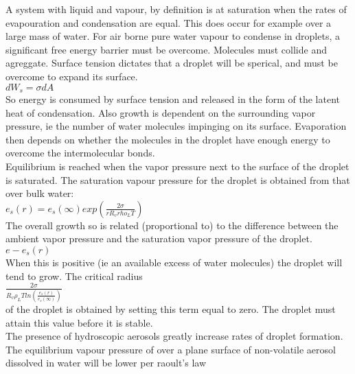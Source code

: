 \documentclass[11pt]{article} %
\begin{document}
A system with liquid and vapour, by definition is at saturation when the rates of evapouration and condensation are equal.  This does occur for example over a large mass of water.  For air borne pure water vapour to condense in droplets, a significant free energy barrier must be overcome.  Molecules must collide and agreggate.  Surface tension dictates that a droplet will be sperical, and must be overcome to expand its surface. \\

$dW_{s} = \sigma dA $ \\

So energy is consumed by surface tension and released in the form of the latent heat of condensation.  Also growth is dependent on the surrounding vapor pressure, ie the number of water molecules impinging on its surface.  Evaporation then depends on whether the molecules in the droplet have enough energy to overcome the intermolecular bonds.  \\

Equilibrium is reached when the vapor pressure next to the surface of the droplet is saturated. The saturation vapour pressure for the droplet is obtained from that over bulk water:\\

 $e_{s}(r) = e_{s}(\infty) exp(\frac{2 \sigma}{r R_{v}rho_{L} T})$ \\

 The overall growth so is related (proportional to) to the difference between the ambient vapor pressure and the saturation vapor pressure of the droplet. \\

$e - e_{s}(r)$ \\

When this is positive (ie an available excess of water molecules) the droplet will tend to grow.  The critical radius \\

$\frac{2\sigma}{R_{v}\rho_{L}T ln(\frac{e_{s}(r)}{e_{s}(\infty)})}$ \\

of the droplet is obtained by setting this term equal to zero.  The droplet must attain this value before it is stable. 
\\

 The presence of hydroscopic aerosols greatly increase rates of droplet formation.  The equilibrium vapour pressure of over a plane surface of non-volatile aerosol dissolved in water will be lower per raoult's law \\
\end{document}
